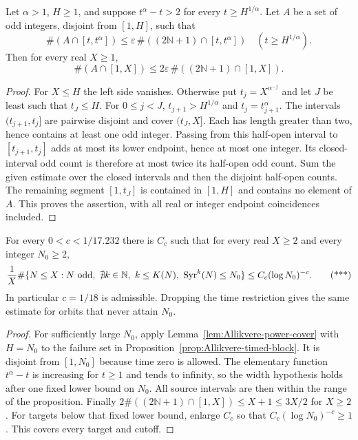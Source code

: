 \begin{lemma}
\label{lem:Allikvere-power-cover}
Let $\alpha>1$, $H\ge1$, and suppose
$t^\alpha-t>2$ for every $t\ge H^{1/\alpha}$.
Let $A$ be a set of odd integers, disjoint from $[1,H]$, such that
\[
 \#(A\cap[t,t^\alpha])
       \le\varepsilon\,\#((2\mathbb N+1)\cap[t,t^\alpha])
       \quad(t\ge H^{1/\alpha}).
\]
Then for every real $X\ge1$,
\[
 \#(A\cap[1,X])\le
           2\varepsilon\,\#((2\mathbb N+1)\cap[1,X]).
\]
\end{lemma}
\begin{proof}
For $X\le H$ the left side vanishes. Otherwise put
$t_j=X^{\alpha^{-j}}$ and let $J$ be least such that $t_J\le H$.
For $0\le j<J$, $t_{j+1}>H^{1/\alpha}$ and
$t_j=t_{j+1}^\alpha$.
The intervals $(t_{j+1},t_j]$ are pairwise disjoint and cover
$(t_J,X]$. Each has length greater than two, hence contains at
least one odd integer. Passing from this half-open interval to
$[t_{j+1},t_j]$ adds at most its lower endpoint, hence at most
one integer. Its closed-interval odd count is therefore at most
twice its half-open odd count. Sum the given estimate over the
closed intervals and then the disjoint half-open counts.
The remaining segment $[1,t_J]$ is contained in $[1,H]$ and
contains no element of $A$. This proves the assertion, with
all real or integer endpoint coincidences included.
\end{proof}

\begin{corollary}
\label{cor:Allikvere-timed-count}
For every $0<c<1/17.232$ there is $C_c$ such that for every real
$X\ge2$ and every integer $N_0\ge2$,
\[
 \frac1X\#\{N\le X:N\ {\rm odd},\
       \nexists k\in\mathbb N,\ k\le K(N),\ \operatorname{Syr}^k(N)\le N_0\}
          \le C_c(\log N_0)^{-c}.                      \tag{***}
\]
In particular $c=1/18$ is admissible. Dropping the time restriction
gives the same estimate for orbits that never attain $N_0$.
\end{corollary}
\begin{proof}
For sufficiently large $N_0$, apply Lemma~\ref{lem:Allikvere-power-cover}
with $H=N_0$ to the failure set in Proposition~\ref{prop:Allikvere-timed-block}.
It is disjoint from $[1,N_0]$ because time zero is allowed.
The elementary function $t^\alpha-t$ is increasing for $t\ge1$
and tends to infinity, so the width hypothesis holds after one
fixed lower bound on $N_0$. All source intervals are then within
the range of the proposition. Finally
$2\#((2\mathbb N+1)\cap[1,X])\le X+1\le3X/2$ for $X\ge2$.
For targets below that fixed lower bound, enlarge $C_c$ so that
$C_c(\log N_0)^{-c}\ge1$. This covers every target and cutoff.
\end{proof}


